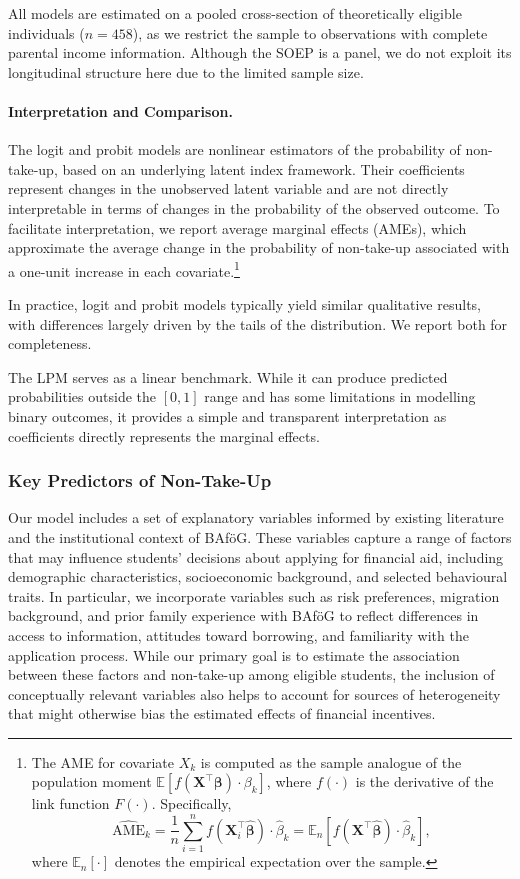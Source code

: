 All models are estimated on a pooled cross-section of theoretically eligible individuals (\( n = 458 \)), as we restrict the sample to observations with complete parental income information. 
Although the SOEP is a panel, we do not exploit its longitudinal structure here due to the limited sample size.

\paragraph{Interpretation and Comparison.} 
The logit and probit models are nonlinear estimators of the probability of non-take-up, based on an underlying latent index framework. 
Their coefficients represent changes in the unobserved latent variable and are not directly interpretable in terms of changes in the probability of the observed outcome. 
To facilitate interpretation, we report average marginal effects (AMEs), which approximate the average change in the probability of non-take-up associated with a one-unit increase in each covariate.\footnote{The AME for covariate \( X_k \) is computed as the sample analogue of the population moment \( \mathbb{E}[f(\mathbf{X}^\top \boldsymbol{\beta}) \cdot \beta_k] \), where \( f(\cdot) \) is the derivative of the link function \( F(\cdot) \). Specifically,
\[
    \widehat{\text{AME}}_k 
    = \frac{1}{n} \sum_{i=1}^n f(\mathbf{X}_i^\top \hat{\boldsymbol{\beta}}) \cdot \hat{\beta}_k
    = \mathbb{E}_n \left[ f(\mathbf{X}^\top \hat{\boldsymbol{\beta}}) \cdot \hat{\beta}_k \right],
\]
where \( \mathbb{E}_n[\cdot] \) denotes the empirical expectation over the sample.}

In practice, logit and probit models typically yield similar qualitative results, with differences largely driven by the tails of the distribution. We report both for completeness.

The LPM serves as a linear benchmark. 
While it can produce predicted probabilities outside the \([0,1]\) range and has some limitations in modelling binary outcomes, it provides a simple and transparent interpretation as coefficients directly represents the marginal effects.

\subsubsection{Key Predictors of Non-Take-Up}
Our model includes a set of explanatory variables informed by existing literature and the institutional context of BAföG. 
These variables capture a range of factors that may influence students' decisions about applying for financial aid, including demographic characteristics, socioeconomic background, and selected behavioural traits. 
In particular, we incorporate variables such as risk preferences, migration background, and prior family experience with BAföG to reflect differences in access to information, attitudes toward borrowing, and familiarity with the application process. 
While our primary goal is to estimate the association between these factors and non-take-up among eligible students, the inclusion of conceptually relevant variables also helps to account for sources of heterogeneity that might otherwise bias the estimated effects of financial incentives.

